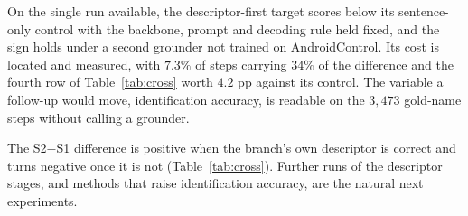 \documentclass[conference]{IEEEtran}
\begin{document}
On the single run available, the descriptor-first target scores below its sentence-only
control with the backbone, prompt and decoding rule held fixed, and the sign holds under a
second grounder not trained on AndroidControl. Its cost is located and measured, with
$7.3\%$ of steps carrying $34\%$ of the difference and the fourth row of
Table~\ref{tab:cross} worth $4.2$ pp against its control. The variable a follow-up would move, identification accuracy, is readable on the $3{,}473$ gold-name steps without
calling a grounder.

The S2$-$S1 difference is positive when the branch's own descriptor is correct and turns
negative once it is not (Table~\ref{tab:cross}). Further runs of the descriptor stages, and methods that raise identification accuracy,
are the natural next experiments.
\end{document}
